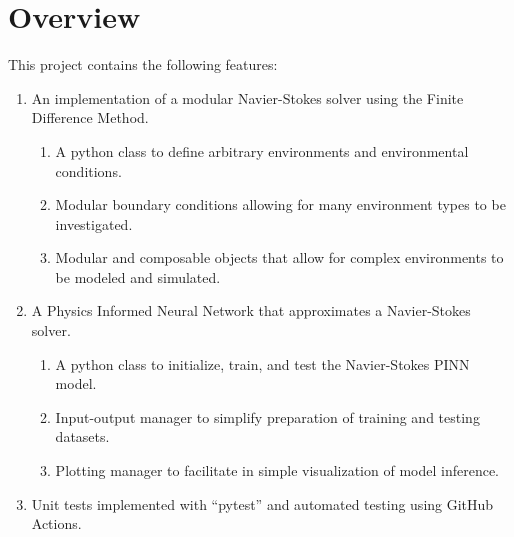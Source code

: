 \section{Overview}
This project contains the following features:

\begin{enumerate}
    \item An implementation of a modular Navier-Stokes solver using the Finite Difference Method.
        \begin{enumerate}
            \item A python class to define arbitrary environments and environmental conditions.
            \item Modular boundary conditions allowing for many environment types to be investigated.
            \item Modular and composable objects that allow for complex environments to be modeled and simulated.
        \end{enumerate}
    \item A Physics Informed Neural Network that approximates a Navier-Stokes solver.
        \begin{enumerate}
            \item A python class to initialize, train, and test the Navier-Stokes PINN model.
            \item Input-output manager to simplify preparation of training and testing datasets.
            \item Plotting manager to facilitate in simple visualization of model inference.
        \end{enumerate}
    \item Unit tests implemented with ``pytest'' and automated testing using GitHub Actions.
\end{enumerate}